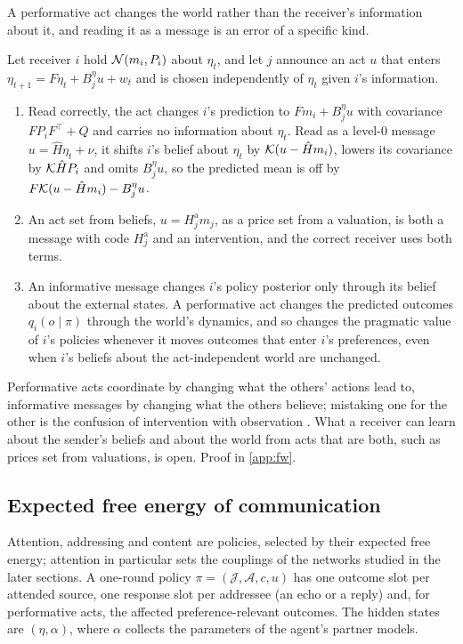A performative act changes the world rather than the receiver's information about it, and reading it as a message is an error of a specific kind.

\begin{proposition}\label{prop:fw-performative}
Let receiver $i$ hold $\mathcal{N}(m_i,P_i)$ about $\eta_t$, and let $j$ announce an act $u$ that enters $\eta_{t+1}=F\eta_t+B^\eta_ju+w_t$ and is chosen independently of $\eta_t$ given $i$'s information.
\begin{enumerate}
\item[(a)] Read correctly, the act changes $i$'s prediction to $Fm_i+B^\eta_ju$ with covariance $FP_iF^\top+Q$ and carries no information about $\eta_t$. Read as a level-0 message $u=\hat H\eta_t+\nu$, it shifts $i$'s belief about $\eta_t$ by $\mathcal{K}(u-\hat Hm_i)$, lowers its covariance by $\mathcal{K}\hat HP_i$ and omits $B^\eta_ju$, so the predicted mean is off by $F\mathcal{K}(u-\hat Hm_i)-B^\eta_ju$.
\item[(b)] An act set from beliefs, $u=H^{\mathrm a}_jm_j$, as a price set from a valuation, is both a message with code $H^{\mathrm a}_j$ and an intervention, and the correct receiver uses both terms.
\item[(c)] An informative message changes $i$'s policy posterior only through its belief about the external states. A performative act changes the predicted outcomes $q_i(o\mid\pi)$ through the world's dynamics, and so changes the pragmatic value of $i$'s policies whenever it moves outcomes that enter $i$'s preferences, even when $i$'s beliefs about the act-independent world are unchanged.
\end{enumerate}
\end{proposition}

Performative acts coordinate by changing what the others' actions lead to, informative messages by changing what the others believe; mistaking one for the other is the confusion of intervention with observation \citep{pearl2009causality}. What a receiver can learn about the sender's beliefs and about the world from acts that are both, such as prices set from valuations, is open. Proof in \cref{app:fw}.

\subsection{Expected free energy of communication}\label{sec:fw-efe}

Attention, addressing and content are policies, selected by their expected free energy; attention in particular sets the couplings of the networks studied in the later sections. A one-round policy $\pi=(\mathcal J,\mathcal A,c,u)$ has one outcome slot per attended source, one response slot per addressee (an echo or a reply) and, for performative acts, the affected preference-relevant outcomes. The hidden states are $(\eta,\alpha)$, where $\alpha$ collects the parameters of the agent's partner models.

